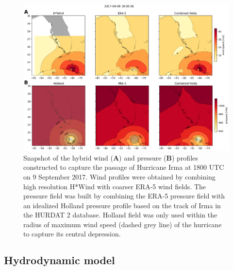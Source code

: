 \documentclass[preprint,12pt,authoryear]{elsarticle}
\begin{document}
\begin{figure}
    \centering
    \includegraphics[width=.99\textwidth]{figures/hwind+holland_vs_era.png}
    \caption{Snapshot of the hybrid wind (\textbf{A}) and pressure (\textbf{B}) profiles constructed to capture the passage of Hurricane Irma at 1800 UTC on 9 September 2017. Wind profiles were obtained by combining high resolution H*Wind with coarser ERA-5 wind fields. The pressure field was built by combining the ERA-5 pressure field with an idealized Holland pressure profile based on the track of Irma in the HURDAT 2 database. Holland field was only used within the radius of maximum wind speed (dashed grey line) of the hurricane to capture its central depression. }
    \label{fig:atm}
\end{figure}

\subsection{Hydrodynamic model}
\end{document}
